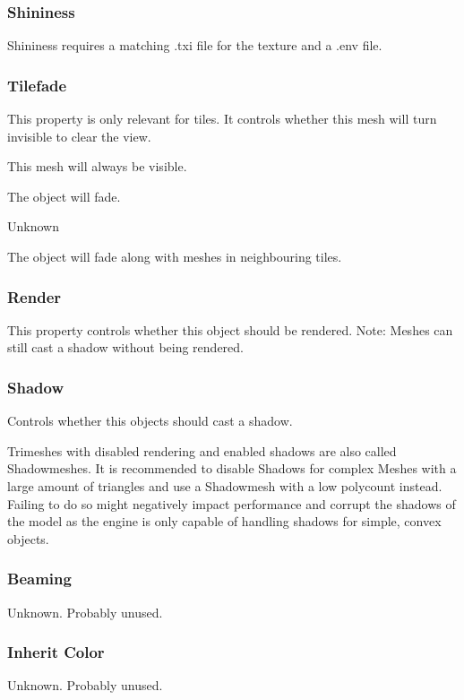 \subsubsection*{Shininess}
Shininess requires a matching .txi file for the texture and a .env file.

\subsubsection*{Tilefade}
This property is only relevant for tiles. It controls whether this 
mesh will turn invisible to clear the view.
\begin{description}[leftmargin=6em,style=nextline]
    \item[None] This mesh will always be visible.
    \item[Fade] The object will fade.
    \item[Base] Unknown
    \item[Neighbour] The object will fade along with meshes in neighbouring tiles.
\end{description}

\subsubsection*{Render}
This property controls whether this object should be rendered. Note: Meshes can still
cast a shadow without being rendered.

\subsubsection*{Shadow}
Controls whether this objects should cast a shadow. 

Trimeshes with disabled rendering and enabled shadows are also called Shadowmeshes.
It is recommended to disable Shadows for complex Meshes with a 
large amount of triangles and use a Shadowmesh with a low polycount instead. 
Failing to do so might negatively impact performance and corrupt the shadows of the 
model as the engine is only capable of handling shadows for simple, convex objects.

\subsubsection*{Beaming}
Unknown. Probably unused.

\subsubsection*{Inherit Color}
Unknown. Probably unused.

